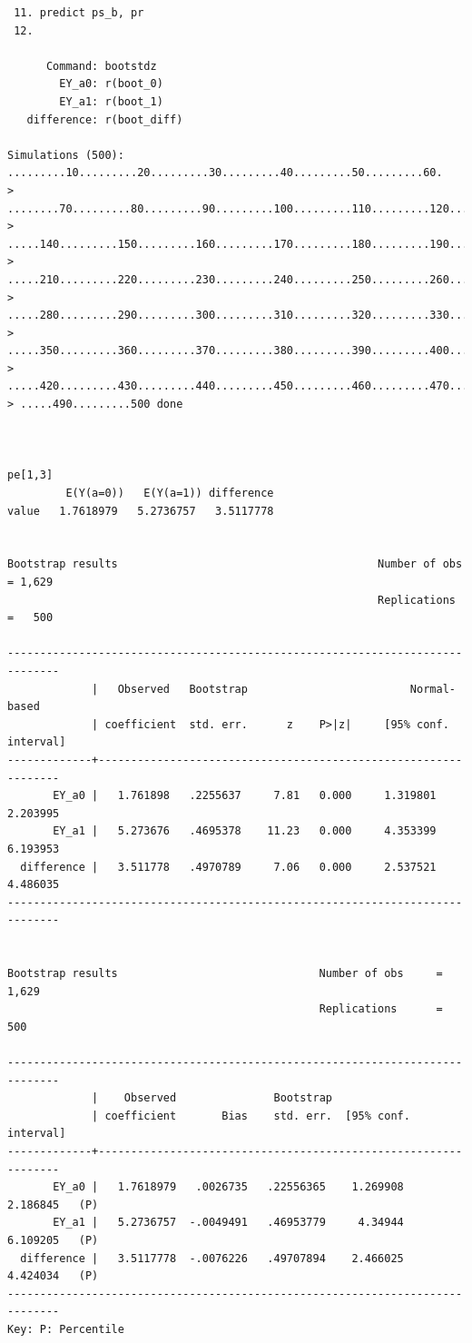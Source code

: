 \documentclass[
  10pt,
  a4paper,
]{book}
\begin{document}
\begin{verbatim}
 11. predict ps_b, pr
 12. 

      Command: bootstdz
        EY_a0: r(boot_0)
        EY_a1: r(boot_1)
   difference: r(boot_diff)

Simulations (500): .........10.........20.........30.........40.........50.........60.
> ........70.........80.........90.........100.........110.........120.........130....
> .....140.........150.........160.........170.........180.........190.........200....
> .....210.........220.........230.........240.........250.........260.........270....
> .....280.........290.........300.........310.........320.........330.........340....
> .....350.........360.........370.........380.........390.........400.........410....
> .....420.........430.........440.........450.........460.........470.........480....
> .....490.........500 done



pe[1,3]
         E(Y(a=0))   E(Y(a=1)) difference
value   1.7618979   5.2736757   3.5117778


Bootstrap results                                        Number of obs = 1,629
                                                         Replications  =   500

------------------------------------------------------------------------------
             |   Observed   Bootstrap                         Normal-based
             | coefficient  std. err.      z    P>|z|     [95% conf. interval]
-------------+----------------------------------------------------------------
       EY_a0 |   1.761898   .2255637     7.81   0.000     1.319801    2.203995
       EY_a1 |   5.273676   .4695378    11.23   0.000     4.353399    6.193953
  difference |   3.511778   .4970789     7.06   0.000     2.537521    4.486035
------------------------------------------------------------------------------


Bootstrap results                               Number of obs     =      1,629
                                                Replications      =        500

------------------------------------------------------------------------------
             |    Observed               Bootstrap
             | coefficient       Bias    std. err.  [95% conf. interval]
-------------+----------------------------------------------------------------
       EY_a0 |   1.7618979   .0026735   .22556365    1.269908   2.186845   (P)
       EY_a1 |   5.2736757  -.0049491   .46953779     4.34944   6.109205   (P)
  difference |   3.5117778  -.0076226   .49707894    2.466025   4.424034   (P)
------------------------------------------------------------------------------
Key: P: Percentile
\end{verbatim}
\end{document}
